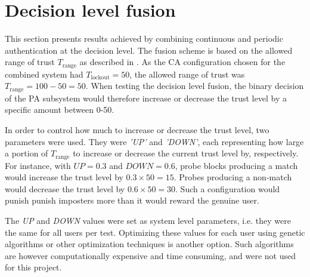 \section{Decision level fusion}
\label{sec:analysis-decision-lvl}
This section presents results achieved by combining continuous and periodic authentication at the decision level.
The fusion scheme is based on the allowed range of trust $T_\text{range}$ as described in .
As the CA configuration chosen for the combined system had $T_{\text{lockout}} = 50$, the allowed range of trust was $T_{\text{range}} = 100-50 = 50$.
When testing the decision level fusion, the binary decision of the PA subsystem would therefore increase or decrease the trust level by a specific amount between 0-50.





In order to control how much to increase or decrease the trust level, two parameters were used.
They were \textit{'UP'} and \textit{'DOWN'}, 
each representing how large a portion of $T_{\text{range}}$ to increase or decrease the current trust level by, respectively.
For instance, with $\textit{UP}=0.3$ and $\textit{DOWN}=0.6$, probe blocks producing a match would increase the trust level by $0.3 \times 50 = 15$.
Probes producing a non-match would decrease the trust level by $0.6 \times 50 = 30$.
Such a configuration would punish punish imposters more than it would reward the genuine user.

The \textit{UP} and \textit{DOWN} values were set as system level parameters, i.e. they were the same for all users per test.
Optimizing these values for each user using genetic algorithms or other optimization techniques is another option.
Such algorithms are however computationally expensive and time consuming, and were not used for this project.

